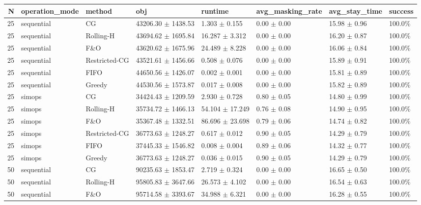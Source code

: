 \begin{tabular}{rlllllll}
\toprule
N & operation_mode & method & obj & runtime & avg_masking_rate & avg_stay_time & success \\
\midrule
25 & sequential & CG & 43206.30 $\pm$ 1438.53 & 1.303 $\pm$ 0.155 & 0.00 $\pm$ 0.00 & 15.98 $\pm$ 0.96 & 100.0\% \\
25 & sequential & Rolling-H & 43694.62 $\pm$ 1695.84 & 16.287 $\pm$ 3.312 & 0.00 $\pm$ 0.00 & 16.20 $\pm$ 0.87 & 100.0\% \\
25 & sequential & F\&O & 43620.62 $\pm$ 1675.96 & 24.489 $\pm$ 8.228 & 0.00 $\pm$ 0.00 & 16.06 $\pm$ 0.84 & 100.0\% \\
25 & sequential & Restricted-CG & 43521.61 $\pm$ 1456.66 & 0.508 $\pm$ 0.076 & 0.00 $\pm$ 0.00 & 15.89 $\pm$ 0.91 & 100.0\% \\
25 & sequential & FIFO & 44650.56 $\pm$ 1426.07 & 0.002 $\pm$ 0.001 & 0.00 $\pm$ 0.00 & 15.81 $\pm$ 0.89 & 100.0\% \\
25 & sequential & Greedy & 44530.56 $\pm$ 1573.87 & 0.017 $\pm$ 0.008 & 0.00 $\pm$ 0.00 & 15.82 $\pm$ 0.89 & 100.0\% \\
25 & simops & CG & 34424.43 $\pm$ 1209.59 & 2.930 $\pm$ 0.728 & 0.80 $\pm$ 0.05 & 14.80 $\pm$ 0.99 & 100.0\% \\
25 & simops & Rolling-H & 35734.72 $\pm$ 1466.13 & 54.104 $\pm$ 17.249 & 0.76 $\pm$ 0.08 & 14.90 $\pm$ 0.95 & 100.0\% \\
25 & simops & F\&O & 35367.48 $\pm$ 1332.51 & 86.696 $\pm$ 23.698 & 0.79 $\pm$ 0.06 & 14.74 $\pm$ 0.82 & 100.0\% \\
25 & simops & Restricted-CG & 36773.63 $\pm$ 1248.27 & 0.617 $\pm$ 0.012 & 0.90 $\pm$ 0.05 & 14.29 $\pm$ 0.79 & 100.0\% \\
25 & simops & FIFO & 37445.33 $\pm$ 1546.82 & 0.008 $\pm$ 0.004 & 0.89 $\pm$ 0.06 & 14.32 $\pm$ 0.77 & 100.0\% \\
25 & simops & Greedy & 36773.63 $\pm$ 1248.27 & 0.036 $\pm$ 0.015 & 0.90 $\pm$ 0.05 & 14.29 $\pm$ 0.79 & 100.0\% \\
50 & sequential & CG & 90235.63 $\pm$ 1853.47 & 2.719 $\pm$ 0.324 & 0.00 $\pm$ 0.00 & 16.65 $\pm$ 0.50 & 100.0\% \\
50 & sequential & Rolling-H & 95805.83 $\pm$ 3647.66 & 26.573 $\pm$ 4.102 & 0.00 $\pm$ 0.00 & 16.54 $\pm$ 0.63 & 100.0\% \\
50 & sequential & F\&O & 95714.58 $\pm$ 3393.67 & 34.988 $\pm$ 6.321 & 0.00 $\pm$ 0.00 & 16.28 $\pm$ 0.55 & 100.0\% \\

\end{tabular}
